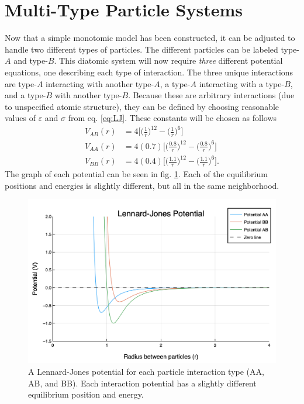 \section{Multi-Type Particle Systems}\label{Sect:diatomic}
\par Now that a simple monotomic model has been constructed, it can be adjusted to handle two different types of particles. The different particles can be labeled type-$A$ and type-$B$. This diatomic system will now require \textit{three} different potential equations, one describing each type of interaction. The three unique interactions are type-$A$ interacting with another type-$A$, a type-$A$ interacting with a type-$B$, and a type-$B$ with another type-$B$. Because these are arbitrary interactions (due to unspecified atomic structure), they can be defined by choosing reasonable values of $\varepsilon$ and $\sigma$ from eq. \ref{eq:LJ}. These constants will be chosen as follows
\begin{align}
V_{AB}(r) &= 4 \bigg[\Big(\frac{1}{r}\Big)^{12} - \Big(\frac{1}{r}\Big)^6\bigg] \label{LJ} \\
V_{AA}(r) &= 4 (0.7) \bigg[\Big(\frac{0.8}{r}\Big)^{12} - \Big(\frac{0.8}{r}\Big)^6\bigg] \label{LJ} \\
V_{BB}(r) &= 4 (0.4) \bigg[\Big(\frac{1.1}{r}\Big)^{12} - \Big(\frac{1.1}{r}\Big)^6\bigg] \label{LJ}.
\end{align}
The graph of each potential can be seen in fig. \ref{fig:3LJ}. Each of the equilibrium positions and energies is slightly different, but all in the same neighborhood.

\begin{figure}%
\centering
\includegraphics[scale = 0.5]{Figures/newLJPotential}
\caption{A Lennard-Jones potential for each particle interaction type (AA, AB, and BB). Each interaction potential has a slightly different equilibrium position and energy. 
\label{fig:3LJ}} 
\end{figure}

